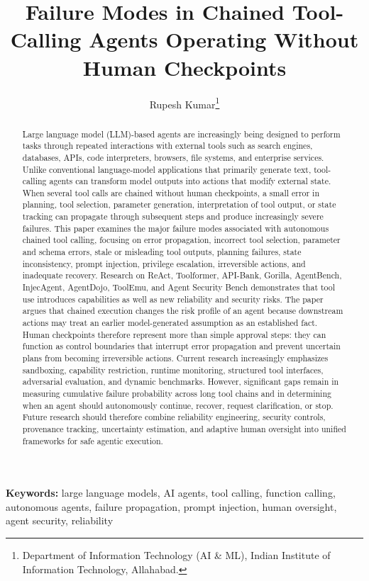 \documentclass[11pt]{article}
\title{Failure Modes in Chained Tool-Calling Agents Operating Without Human Checkpoints}
\author{Rupesh Kumar\thanks{Department of Information Technology (AI \& ML), Indian Institute of Information Technology, Allahabad.}}
\date{}
\begin{document}
\maketitle

\begin{abstract}
Large language model (LLM)-based agents are increasingly being designed to perform
tasks through repeated interactions with external tools such as search engines,
databases, APIs, code interpreters, browsers, file systems, and enterprise services.
Unlike conventional language-model applications that primarily generate text,
tool-calling agents can transform model outputs into actions that modify external state.
When several tool calls are chained without human checkpoints, a small error in
planning, tool selection, parameter generation, interpretation of tool output, or state
tracking can propagate through subsequent steps and produce increasingly severe
failures. This paper examines the major failure modes associated with autonomous
chained tool calling, focusing on error propagation, incorrect tool selection, parameter
and schema errors, stale or misleading tool outputs, planning failures, state
inconsistency, prompt injection, privilege escalation, irreversible actions, and
inadequate recovery. Research on ReAct, Toolformer, API-Bank, Gorilla, AgentBench,
InjecAgent, AgentDojo, ToolEmu, and Agent Security Bench demonstrates that tool
use introduces capabilities as well as new reliability and security risks. The paper
argues that chained execution changes the risk profile of an agent because
downstream actions may treat an earlier model-generated assumption as an
established fact. Human checkpoints therefore represent more than simple approval
steps: they can function as control boundaries that interrupt error propagation and
prevent uncertain plans from becoming irreversible actions. Current research
increasingly emphasizes sandboxing, capability restriction, runtime monitoring,
structured tool interfaces, adversarial evaluation, and dynamic benchmarks. However,
significant gaps remain in measuring cumulative failure probability across long tool
chains and in determining when an agent should autonomously continue, recover,
request clarification, or stop. Future research should therefore combine reliability
engineering, security controls, provenance tracking, uncertainty estimation, and
adaptive human oversight into unified frameworks for safe agentic execution.
\end{abstract}

\noindent\textbf{Keywords:} large language models, AI agents, tool calling, function calling,
autonomous agents, failure propagation, prompt injection, human oversight,
agent security, reliability
\end{document}
